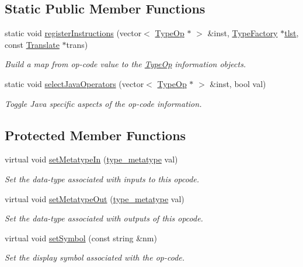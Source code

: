 \subsection*{Static Public Member Functions}
\begin{DoxyCompactItemize}
\item 
static void \mbox{\hyperlink{class_type_op_a1a6335312cb599605f7cddb617ab113d}{register\+Instructions}} (vector$<$ \mbox{\hyperlink{class_type_op}{Type\+Op}} $\ast$ $>$ \&inst, \mbox{\hyperlink{class_type_factory}{Type\+Factory}} $\ast$\mbox{\hyperlink{class_type_op_a06a48c0a8067e447395c9ccf8e1a8b5c}{tlst}}, const \mbox{\hyperlink{class_translate}{Translate}} $\ast$trans)
\begin{DoxyCompactList}\small\item\em Build a map from op-\/code value to the \mbox{\hyperlink{class_type_op}{Type\+Op}} information objects. \end{DoxyCompactList}\item 
static void \mbox{\hyperlink{class_type_op_a518700fe96d7e215d8c42d6049626c88}{select\+Java\+Operators}} (vector$<$ \mbox{\hyperlink{class_type_op}{Type\+Op}} $\ast$ $>$ \&inst, bool val)
\begin{DoxyCompactList}\small\item\em Toggle Java specific aspects of the op-\/code information. \end{DoxyCompactList}\end{DoxyCompactItemize}
\subsection*{Protected Member Functions}
\begin{DoxyCompactItemize}
\item 
virtual void \mbox{\hyperlink{class_type_op_a7b37f5313e117f939f6769e130af5865}{set\+Metatype\+In}} (\mbox{\hyperlink{type_8hh_aef6429f2523cdf4d415ba04a0209e61f}{type\+\_\+metatype}} val)
\begin{DoxyCompactList}\small\item\em Set the data-\/type associated with inputs to this opcode. \end{DoxyCompactList}\item 
virtual void \mbox{\hyperlink{class_type_op_a6c6e4e0f7aced28b8807f006e7ebc847}{set\+Metatype\+Out}} (\mbox{\hyperlink{type_8hh_aef6429f2523cdf4d415ba04a0209e61f}{type\+\_\+metatype}} val)
\begin{DoxyCompactList}\small\item\em Set the data-\/type associated with outputs of this opcode. \end{DoxyCompactList}\item 
virtual void \mbox{\hyperlink{class_type_op_a55323290cba73850cb2968f4a0a090aa}{set\+Symbol}} (const string \&nm)
\begin{DoxyCompactList}\small\item\em Set the display symbol associated with the op-\/code. \end{DoxyCompactList}\end{DoxyCompactItemize}
